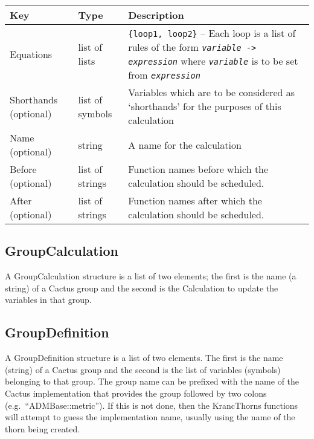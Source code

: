\documentclass{report}
\newcommand{\tablewidth}{\textwidth}
\begin{document}
\begin{center}
\begin{tabularx}{\tablewidth}{|l|l|X|}
  \hline
  \bf Key & \bf Type & \bf Description \\
  \hline
  Equations       & list of lists    & {\tt \{loop1, loop2\}} -- Each loop is a list
                                       of rules of the form {\tt {\it variable} -> 
                                       {\it expression}} where
                              {\tt \it variable} is to be set from {\tt \it expression} \\
  Shorthands (optional)  & list of symbols    & Variables which are to be considered
                              as `shorthands' for the purposes of this calculation \\
  Name (optional) & string  & A name for the calculation \\
  Before (optional) & list of strings  & Function names before which the
                              calculation should be scheduled. \\
  After (optional)  & list of strings &  Function names after which the
                              calculation should be scheduled. \\
  \hline
\end{tabularx}
\end{center}

\subsection{GroupCalculation}
\label{app:GroupCalculation}

A GroupCalculation structure is a list of two elements; the first is
the name (a string) of a Cactus group and the second is the
Calculation to update the variables in that group.

\subsection{GroupDefinition}
\label{GroupDefinition}

A GroupDefinition structure is a list of two elements.  The first is
the name (string) of a Cactus group and the second is the list of
variables (symbols) belonging to that group. The group name can be
prefixed with the name of the Cactus implementation that provides the
group followed by two colons (e.g.~``ADMBase::metric'').  If this is
not done, then the KrancThorns functions will attempt to guess the
implementation name, usually using the name of the thorn being
created.
\end{document}
